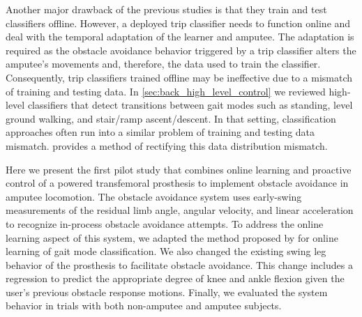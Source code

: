 Another major drawback of the previous studies is that they train and test
classifiers offline. However, a deployed trip classifier needs to function
online and deal with the temporal adaptation of the learner and amputee. The
adaptation is required as the obstacle avoidance behavior triggered by a trip
classifier alters the amputee's movements and, therefore, the data used to train
the classifier. Consequently, trip classifiers trained offline may be
ineffective due to a mismatch of training and testing data. In
\cref{sec:back_high_level_control} we reviewed high-level classifiers that
detect transitions between gait modes such as standing, level ground walking,
and stair/ramp ascent/descent. In that setting, classification approaches often
run into a similar problem of training and testing data mismatch.
\citet{spanias2018online} provides a method of rectifying this data distribution
mismatch.

Here we present the first pilot study that combines online learning and
proactive control of a powered transfemoral prosthesis to implement obstacle
avoidance in amputee locomotion. The obstacle avoidance system uses early-swing
measurements of the residual limb angle, angular velocity, and linear
acceleration to recognize in-process obstacle avoidance attempts. To address the
online learning aspect of this system, we adapted the method proposed by
\citet{spanias2018online} for online learning of gait mode classification. We
also changed the existing swing leg behavior of the prosthesis to facilitate
obstacle avoidance. This change includes a regression to predict the appropriate
degree of knee and ankle flexion given the user's previous obstacle response
motions. Finally, we evaluated the system behavior in trials with both
non-amputee and amputee subjects.
